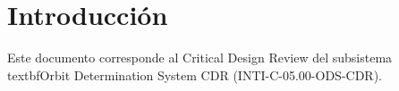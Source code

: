 \section{Introducción}
Este documento corresponde al Critical Design Review del subsistema \\textbf{Orbit Determination System CDR} (INTI-C-05.00-ODS-CDR).
